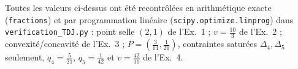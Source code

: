 \documentclass[11pt,a4paper]{article}
\begin{document}
\vspace{0.5cm}
\begin{verifbox}
Toutes les valeurs ci-dessus ont été recontrôlées en arithmétique exacte (\texttt{fractions}) et par programmation linéaire (\texttt{scipy.optimize.linprog}) dans \texttt{verification\_TDJ.py} : point selle $(2,1)$ de l'Ex.~1 ; $v=\frac{10}{3}$ de l'Ex.~2 ; convexité/concavité de l'Ex.~3 ; $P=(\frac3{14},\frac1{21})$, contraintes saturées $\Delta_4,\Delta_5$ seulement, $q_4=\frac5{21}$, $q_5=\frac1{42}$ et $v=\frac{42}{11}$ de l'Ex.~4.
\end{verifbox}
\end{document}
